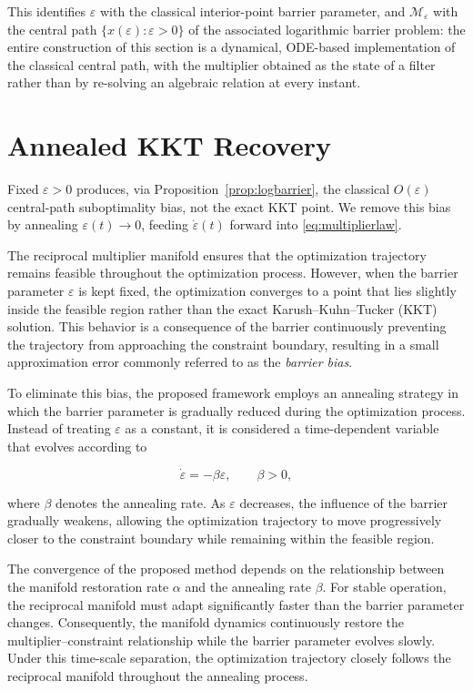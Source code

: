 \documentclass[11pt,onecolumn]{article}
\theoremstyle{definition}
\theoremstyle{remark}
\newcommand{\Mveps}{\mathcal{M}_\varepsilon}
\begin{document}
This identifies $\varepsilon$ with the classical interior-point barrier parameter, and
$\Mveps$ with the central path $\{x(\varepsilon) : \varepsilon > 0\}$ of the associated
logarithmic barrier problem: the entire construction of this section is a dynamical, ODE-based
implementation of the classical central path, with the multiplier obtained as the state of a
filter rather than by re-solving an algebraic relation at every instant.

\section{Annealed KKT Recovery} \label{sec:annealed}

Fixed $\varepsilon > 0$ produces, via Proposition~\ref{prop:logbarrier}, the classical
$O(\varepsilon)$ central-path suboptimality bias, not the exact KKT point. We remove this bias
by annealing $\varepsilon(t) \to 0$, feeding $\dot\varepsilon(t)$ forward into
\eqref{eq:multiplierlaw}.


The reciprocal multiplier manifold ensures that the optimization trajectory remains feasible throughout the optimization process. However, when the barrier parameter $\varepsilon$ is kept fixed, the optimization converges to a point that lies slightly inside the feasible region rather than the exact Karush--Kuhn--Tucker (KKT) solution. This behavior is a consequence of the barrier continuously preventing the trajectory from approaching the constraint boundary, resulting in a small approximation error commonly referred to as the \emph{barrier bias}.

To eliminate this bias, the proposed framework employs an annealing strategy in which the barrier parameter is gradually reduced during the optimization process. Instead of treating $\varepsilon$ as a constant, it is considered a time-dependent variable that evolves according to

\begin{equation}
\dot{\varepsilon}=-\beta\varepsilon,\qquad \beta>0,
\label{eq:annealing}
\end{equation}

where $\beta$ denotes the annealing rate. As $\varepsilon$ decreases, the influence of the barrier gradually weakens, allowing the optimization trajectory to move progressively closer to the constraint boundary while remaining within the feasible region.

The convergence of the proposed method depends on the relationship between the manifold restoration rate $\alpha$ and the annealing rate $\beta$. For stable operation, the reciprocal manifold must adapt significantly faster than the barrier parameter changes. Consequently, the manifold dynamics continuously restore the multiplier--constraint relationship while the barrier parameter evolves slowly. Under this time-scale separation, the optimization trajectory closely follows the reciprocal manifold throughout the annealing process.
\end{document}
